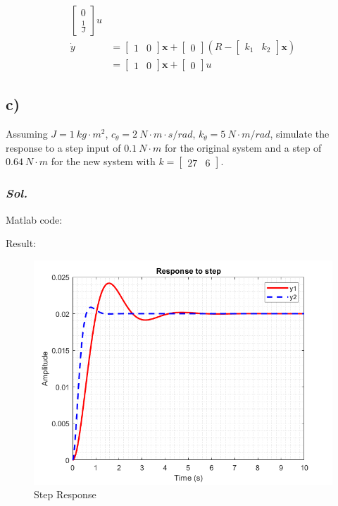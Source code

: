 \begin{equation}
\begin{split}
\begin{bmatrix}
            0\\
            \frac{1}{J}
        \end{bmatrix}u\\ 
        \dot{y} &=
        \begin{bmatrix}
            1 & 0
        \end{bmatrix}
        \textbf{x} + 
        \begin{bmatrix}
            0
        \end{bmatrix}
        \left(R - \begin{bmatrix} k_1 & k_2 \end{bmatrix}
        \textbf{x}
        \right) \\
        &= \begin{bmatrix}
            1 & 0
        \end{bmatrix}
        \textbf{x} + 
        \begin{bmatrix}
            0
        \end{bmatrix}u
    \end{split}
\end{equation}

\subsection{c)}
Assuming $J = 1\ kg\cdot m^2$, $c_{\theta} =2\ N\cdot m\cdot s/rad$, $k_{\theta} =5\ N\cdot m/rad$, simulate the response to a step input of $0.1\ N\cdot m$ for the original system and a step of $0.64\ N\cdot m$ for the new system with $k =\begin{bmatrix}27 & 6\end{bmatrix}$.

\subsubsection{\textit{ Sol. }}
Matlab code:

Result:
\begin{figure}[htp]
    \centering
    \includegraphics[width=15cm]{images/Q3_c_fig.png}
    \caption{Step Response}
    \label{fig:Q3c}
\end{figure}
\pagebreak